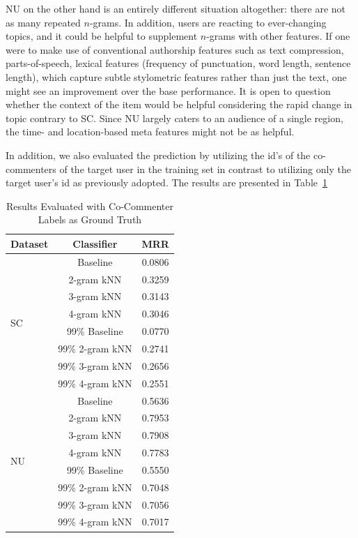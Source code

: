 NU on the other hand is an entirely different situation altogether: there are not as many repeated $n$-grams. In addition, users are reacting to ever-changing topics, and it could be helpful to supplement $n$-grams with other features. If one were to make use of conventional authorship features such as text compression, parts-of-speech, lexical features (frequency of punctuation, word length, sentence length), which capture subtle stylometric features rather than just the text, one might see an improvement over the base performance. It is open to question whether the context of the item would be helpful considering the rapid change in topic contrary to SC. Since NU largely caters to an audience of a single region, the time- and location-based meta features might not be as helpful.

In addition, we also evaluated the prediction by utilizing the id's of the co-commenters of the target user in the training set in contrast to utilizing only the target user's id as previously adopted. The results are presented in Table~\ref{tab:co_results}

\begin{table}[!h]
\centering
\begin{tabular}{|l|c|c|}
\hline
 \textbf{Dataset} & \textbf{Classifier} & \textbf{MRR} \\ \hline
 \multirow{8}{*}{SC} 
 & Baseline & 0.0806 \\ \cline{2-3}
 & 2-gram kNN & 0.3259 \\ \cline{2-3}
 & 3-gram kNN & 0.3143 \\ \cline{2-3}
 & 4-gram kNN & 0.3046 \\ \cline{2-3}
 & 99\% Baseline & 0.0770 \\ \cline{2-3}
 & 99\% 2-gram kNN & 0.2741 \\ \cline{2-3}
 & 99\% 3-gram kNN & 0.2656 \\ \cline{2-3}
 & 99\% 4-gram kNN & 0.2551 \\ \hline
 \multirow{8}{*}{NU} 
 & Baseline & 0.5636 \\ \cline{2-3}
 & 2-gram kNN & 0.7953 \\ \cline{2-3}
 & 3-gram kNN & 0.7908 \\ \cline{2-3}
 & 4-gram kNN & 0.7783 \\ \cline{2-3}
 & 99\% Baseline & 0.5550 \\ \cline{2-3}
 & 99\% 2-gram kNN & 0.7048 \\ \cline{2-3}
 & 99\% 3-gram kNN & 0.7056 \\ \cline{2-3}
 & 99\% 4-gram kNN & 0.7017 \\ \hline
\end{tabular}
\caption{Results Evaluated with Co-Commenter Labels as Ground Truth}
\label{tab:co_results}
\end{table}

